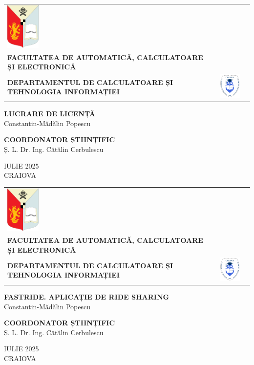 \newcommand{\headerpage}[1]
{
\begin{center}
  \begin{tabular}{m{2cm} m{10cm} m{2cm}}
    \includegraphics[width=1.7cm]{Assets/left-logo.png} &
    \centering
    {\fontsize{10pt}{10pt}\selectfont
      \textbf{UNIVERSITATEA DIN CRAIOVA} \\[0.3em]
      \textbf{FACULTATEA DE AUTOMATICĂ, CALCULATOARE ȘI ELECTRONICĂ} \\[0.7em]
      \textbf{DEPARTAMENTUL DE CALCULATOARE ȘI TEHNOLOGIA INFORMAȚIEI}
    } &
    \includegraphics[width=1.7cm]{Assets/right-logo.png}
  \end{tabular}
\end{center}

\vspace{4cm}

\begin{center}
  {\fontsize{14pt}{14pt}\selectfont
   \textbf{#1} \\[1em]
  {Constantin-Mădălin Popescu}
  }
\end{center}

\vspace{3cm}

\begin{center}
   {\fontsize{12pt}{12pt}\selectfont
   \textbf{COORDONATOR ȘTIINȚIFIC} \\[1em]
   {Ș. L. Dr. Ing. Cătălin Cerbulescu}
   }
\end{center}

\vfill

\begin{center}
  {\fontsize{12pt}{12pt}\selectfont IULIE 2025 \\
  CRAIOVA}
\end{center}
}

\thispagestyle{empty}
\headerpage{LUCRARE DE LICENȚĂ}

\newpage
\thispagestyle{empty}
\headerpage{FASTRIDE. APLICAȚIE DE RIDE SHARING}

\newpage
\thispagestyle{empty}
\null
\newpage